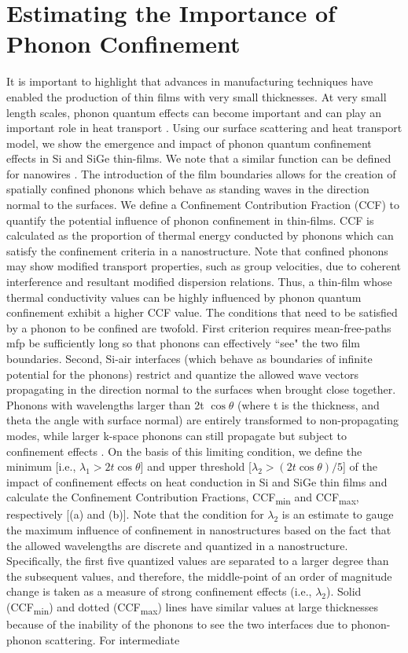 \section{Estimating the Importance of Phonon Confinement}
It is important to highlight that advances in manufacturing techniques have enabled the production of thin films with very small thicknesses. At very small length scales, phonon quantum effects can become important and can play an important role in heat transport \cite{RN205,RN153}. Using our surface scattering and heat transport model, we show the emergence and impact of phonon quantum confinement effects \cite{RN139} in Si and SiGe thin-films. We note that a similar function can be defined for nanowires \cite{ownNW}. The introduction of the film boundaries allows for the creation of spatially confined phonons which behave as standing waves in the direction normal to the surfaces. We define a Confinement Contribution Fraction (CCF) to quantify the potential influence of phonon confinement in thin-films. CCF is calculated as the proportion of thermal energy conducted by phonons which can satisfy the confinement criteria in a nanostructure. Note that confined phonons may show modified transport properties, such as group velocities, due to coherent interference and resultant modified dispersion relations. Thus, a thin-film whose thermal conductivity values can be highly influenced by phonon quantum confinement exhibit a higher CCF value. The conditions that need to be satisfied by a phonon to be confined are twofold. First criterion requires mean-free-paths \gls{mfp} be sufficiently long so that phonons can effectively ``see" the two film boundaries. Second, Si-air interfaces (which behave as boundaries of infinite potential for the phonons) restrict and quantize the allowed wave vectors propagating in the direction normal to the surfaces when brought close together. Phonons with wavelengths larger than 2\gls{t} $\cos\theta$ (where \gls{t} is the thickness, and \gls{theta} the angle with surface normal) are entirely transformed to non-propagating modes, while larger k-space phonons can still propagate but subject to confinement effects \cite{book_Zangwill}. On the basis of this limiting condition, we define the minimum [i.e., $\lambda_1>2t\cos\theta$] and upper threshold [$\lambda_2>(2t\cos\theta)/5$] of the impact of confinement effects on heat conduction in Si and SiGe thin films and calculate the Confinement Contribution Fractions, CCF\textsubscript{min} and CCF\textsubscript{max}, respectively [(a) and (b)]. Note that the condition for $\lambda_2$ is an estimate to gauge the maximum influence of confinement in nanostructures based on the fact that the allowed wavelengths are discrete and quantized in a nanostructure. Specifically, the first five quantized values are separated to a larger degree than the subsequent values, and therefore, the middle-point of an order of magnitude change is taken as a measure of strong confinement effects (i.e., $\lambda_2$). Solid (CCF\textsubscript{min}) and dotted (CCF\textsubscript{max}) lines have similar values at large thicknesses because of the inability of the phonons to see the two interfaces due to phonon-phonon scattering. For intermediate 
